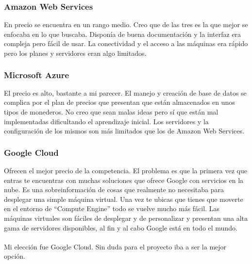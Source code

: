\subsubsection{Amazon Web Services}
En precio se encuentra en un rango medio. Creo que de las tres es la que mejor se enfocaba en lo que buscaba. Disponía de buena documentación y la interfaz era compleja pero fácil de usar. La conectividad y el acceso a las máquinas era rápido pero los planes y servidores eran algo limitados.
\subsubsection{Microsoft Azure}
El precio es alto, bastante a mi parecer. El manejo y creación de base de datos se complica por el plan de precios que presentan que están almacenados en unos tipos de monederos. No creo que sean malas ideas pero sí que están mal implementadas dificultando el aprendizaje inicial. Los servidores y la configuración de los mismos son más limitados que los de Amazon Web Services.
\subsubsection{Google Cloud}
Ofrecen el mejor precio de la competencia. El problema es que la primera vez que entras te encuentras con muchas soluciones que ofrece Google con servicios en la nube. Es una sobreinformación de cosas que realmente no necesitaba para desplegar una simple máquina virtual. Una vez te ubicas que tienes que moverte en el entorno de ``Compute Engine'' todo se vuelve mucho más fácil. Las máquinas virtuales son fáciles de desplegar y de personalizar y presentan una alta gama de servidores disponibles, al fin y al cabo Google está en todo el mundo.
\\\\Mi elección fue Google Cloud. Sin duda para el proyecto iba a ser la mejor opción.